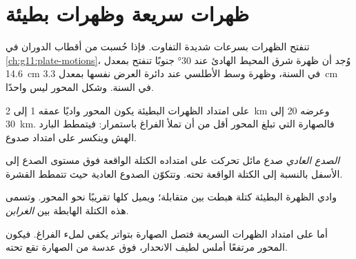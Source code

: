 \section{ظهرات سريعة وظهرات بطيئة}

تنفتح الظهرات بسرعات شديدة التفاوت. فإذا حُسبت من أقطاب الدوران في
\cref{ch:g11:plate-motions}، وُجد أن ظهرة شرق المحيط الهادئ عند \ang{30} جنوبًا تنفتح بمعدل
\qty{14.6}{cm} في السنة، وظهرة وسط الأطلسي عند دائرة العرض نفسها بمعدل
\qty{3.3}{cm} في السنة. وشكل المحور ليس واحدًا.

على امتداد الظهرات البطيئة يكون المحور واديًا عمقه 1 إلى \qty{2}{km} وعرضه 20 إلى
\qty{30}{km}. فالصهارة التي تبلغ المحور أقل من أن تملأ الفراغ
باستمرار: فيتمطط  البارد الهش وينكسر على امتداد
صدوع.

\begin{definition}\label{def:g11:ocean-ridges:normal-fault}
\emph{الصدع العادي} صدع مائل تحركت على امتداده
الكتلة الواقعة فوق مستوى الصدع إلى الأسفل بالنسبة إلى الكتلة الواقعة
تحته. وتتكوّن الصدوع العادية حيث تتمطط القشرة.
\end{definition}

وادي الظهرة البطيئة كتلة هبطت بين 
متقابلة؛ ويميل كلها تقريبًا نحو المحور. وتسمى هذه الكتلة الهابطة
بين  \emph{الغرابن}.

أما على امتداد الظهرات السريعة فتصل الصهارة بتواتر يكفي لملء الفراغ. فيكون المحور
مرتفعًا أملس لطيف الانحدار، فوق عدسة من الصهارة تقع تحته.

